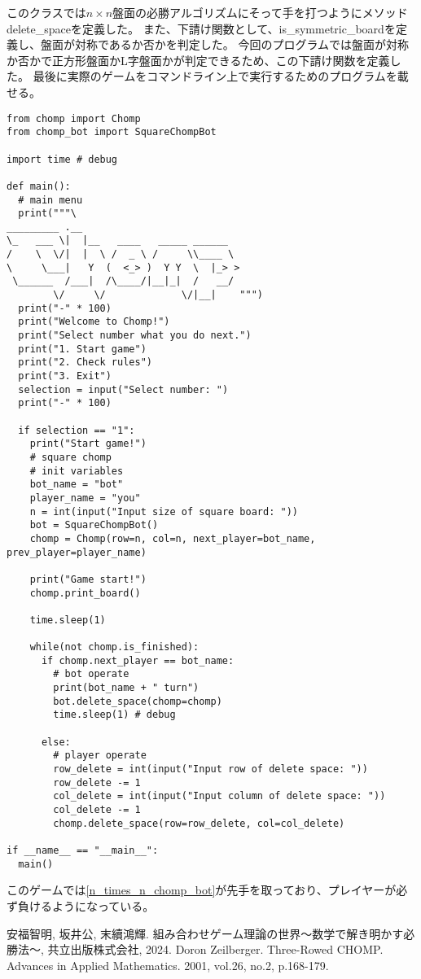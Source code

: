 \documentclass[uplatex,dvipdfmx,a4paper,10pt]{jsarticle}
\theoremstyle{definition}
\begin{document}
このクラスでは\(n \times n\)盤面の必勝アルゴリズムにそって手を打つようにメソッドdelete\_spaceを定義した。
また、下請け関数として、is\_symmetric\_boardを定義し、盤面が対称であるか否かを判定した。
今回のプログラムでは盤面が対称か否かで正方形盤面かL字盤面かが判定できるため、この下請け関数を定義した。
最後に実際のゲームをコマンドライン上で実行するためのプログラムを載せる。

\begin{lstlisting}[caption={\(n \times n\)局面のCHOMPゲームのコード}]
from chomp import Chomp
from chomp_bot import SquareChompBot

import time # debug

def main():
  # main menu
  print("""\
_________ .__                           
\_   ___ \|  |__   ____   _____ ______  
/    \  \/|  |  \ /  _ \ /     \\____ \ 
\     \___|   Y  (  <_> )  Y Y  \  |_> >
 \______  /___|  /\____/|__|_|  /   __/ 
        \/     \/             \/|__|    """)
  print("-" * 100)
  print("Welcome to Chomp!")
  print("Select number what you do next.")
  print("1. Start game")
  print("2. Check rules")
  print("3. Exit")
  selection = input("Select number: ")
  print("-" * 100)

  if selection == "1":
    print("Start game!")
    # square chomp
    # init variables
    bot_name = "bot"
    player_name = "you"
    n = int(input("Input size of square board: "))
    bot = SquareChompBot()
    chomp = Chomp(row=n, col=n, next_player=bot_name, prev_player=player_name)

    print("Game start!")
    chomp.print_board()

    time.sleep(1)

    while(not chomp.is_finished):
      if chomp.next_player == bot_name:
        # bot operate
        print(bot_name + " turn")
        bot.delete_space(chomp=chomp)
        time.sleep(1) # debug

      else:
        # player operate
        row_delete = int(input("Input row of delete space: "))
        row_delete -= 1
        col_delete = int(input("Input column of delete space: "))
        col_delete -= 1
        chomp.delete_space(row=row_delete, col=col_delete)
    
if __name__ == "__main__":
  main()
\end{lstlisting}

このゲームでは\ref{n_times_n_chomp_bot}が先手を取っており、プレイヤーが必ず負けるようになっている。

\begin{thebibliography}{99}
 安福智明, 坂井公, 末續鴻輝. 組み合わせゲーム理論の世界〜数学で解き明かす必勝法〜, 共立出版株式会社, 2024.
 Doron Zeilberger. Three-Rowed CHOMP. Advances in Applied Mathematics. 2001, vol.26, no.2, p.168-179. 
\end{thebibliography}
\end{document}
